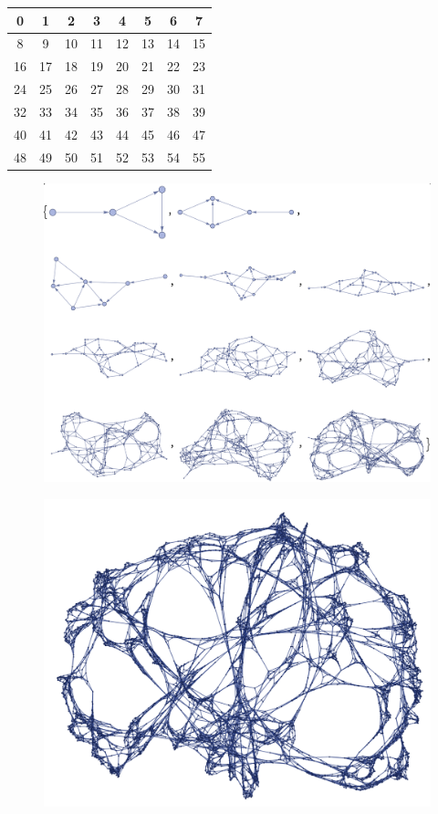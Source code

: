 \documentclass[20pt]{extarticle}
\begin{document}
    \begin{center}\begin{tabular}{ |c|c|c|c|c|c|c|c| }
\hline
0 & 1 & 2 & 3 & 4 & 5 & 6 & 7 \\
\hline
8 & 9 & 10 & 11 & 12 & 13 & 14 & 15 \\
\hline
16 & 17 & 18 & 19 & 20 & 21 & 22 & 23 \\
\hline
24 & 25 & 26 & 27 & 28 & 29 & 30 & 31 \\
\hline
32 & 33 & 34 & 35 & 36 & 37 & 38 & 39 \\
\hline
40 & 41 & 42 & 43 & 44 & 45 & 46 & 47 \\
\hline
48 & 49 & 50 & 51 & 52 & 53 & 54 & 55 \\
\hline
\end{tabular}\end{center}\begin{figure}[h]
    \includegraphics[width=16cm]{progression.png}
\end{figure}\begin{figure}[h]
    \includegraphics[width=16cm]{graph.png}
\end{figure}
    
\end{document}

